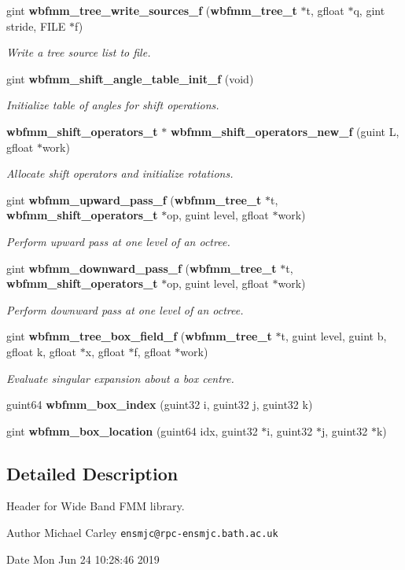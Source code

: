 \begin{DoxyCompactItemize}
gint {\bf wbfmm\+\_\+tree\+\_\+write\+\_\+sources\+\_\+f} ({\bf wbfmm\+\_\+tree\+\_\+t} $\ast$t, gfloat $\ast$q, gint stride, F\+I\+L\+E $\ast$f)
\begin{DoxyCompactList}\small\item\em Write a tree source list to file. \end{DoxyCompactList}\item 
gint {\bf wbfmm\+\_\+shift\+\_\+angle\+\_\+table\+\_\+init\+\_\+f} (void)
\begin{DoxyCompactList}\small\item\em Initialize table of angles for shift operations. \end{DoxyCompactList}\item 
{\bf wbfmm\+\_\+shift\+\_\+operators\+\_\+t} $\ast$ {\bf wbfmm\+\_\+shift\+\_\+operators\+\_\+new\+\_\+f} (guint L, gfloat $\ast$work)
\begin{DoxyCompactList}\small\item\em Allocate shift operators and initialize rotations. \end{DoxyCompactList}\item 
gint {\bf wbfmm\+\_\+upward\+\_\+pass\+\_\+f} ({\bf wbfmm\+\_\+tree\+\_\+t} $\ast$t, {\bf wbfmm\+\_\+shift\+\_\+operators\+\_\+t} $\ast$op, guint level, gfloat $\ast$work)
\begin{DoxyCompactList}\small\item\em Perform upward pass at one level of an octree. \end{DoxyCompactList}\item 
gint {\bf wbfmm\+\_\+downward\+\_\+pass\+\_\+f} ({\bf wbfmm\+\_\+tree\+\_\+t} $\ast$t, {\bf wbfmm\+\_\+shift\+\_\+operators\+\_\+t} $\ast$op, guint level, gfloat $\ast$work)
\begin{DoxyCompactList}\small\item\em Perform downward pass at one level of an octree. \end{DoxyCompactList}\item 
gint {\bf wbfmm\+\_\+tree\+\_\+box\+\_\+field\+\_\+f} ({\bf wbfmm\+\_\+tree\+\_\+t} $\ast$t, guint level, guint b, gfloat k, gfloat $\ast$x, gfloat $\ast$f, gfloat $\ast$work)
\begin{DoxyCompactList}\small\item\em Evaluate singular expansion about a box centre. \end{DoxyCompactList}\item 
guint64 {\bf wbfmm\+\_\+box\+\_\+index} (guint32 i, guint32 j, guint32 k)
\item 
gint {\bf wbfmm\+\_\+box\+\_\+location} (guint64 idx, guint32 $\ast$i, guint32 $\ast$j, guint32 $\ast$k)
\end{DoxyCompactItemize}


\subsection{Detailed Description}
Header for Wide Band F\+M\+M library. 

\begin{DoxyAuthor}{Author}
Michael Carley {\tt ensmjc@rpc-\/ensmjc.\+bath.\+ac.\+uk} 
\end{DoxyAuthor}
\begin{DoxyDate}{Date}
Mon Jun 24 10\+:28\+:46 2019 
\end{DoxyDate}

